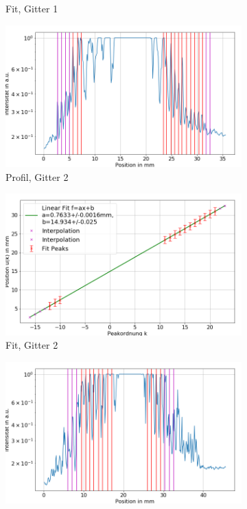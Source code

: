 \documentclass[
	a4paper,
	12pt,
	pagesize,
	ngerman
]{scrartcl}
\begin{document}
\begin{figure}[H]
\begin{subfigure}[b]{0.475\textwidth}
            \caption[]%
            {Fit, Gitter 1}
            \label{fig_3_fit_g1}
        \end{subfigure}
        \begin{subfigure}[b]{0.475\textwidth}
            \centering
            \includegraphics[width=\textwidth]{img/3/3_trafo_g2}
            \caption%
            {Profil, Gitter 2}
            \label{fig_3_profil_g2}
        \end{subfigure}
        \hfill
        \begin{subfigure}[b]{0.475\textwidth}
            \centering
            \includegraphics[width=\textwidth]{img/3/3_trafo_g2_fit}
            \caption[]%
            {Fit, Gitter 2}
            \label{fig_3_fit_g2}
        \end{subfigure}
        \begin{subfigure}[b]{0.475\textwidth}
            \centering
            \includegraphics[width=\textwidth]{img/3/3_trafo_g3}

\end{subfigure}
\end{figure}
\end{document}
